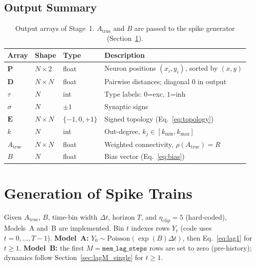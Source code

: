 \documentclass[11pt]{article}
\begin{document}
\subsection{Output Summary}

\begin{table}[h]
\centering
\begin{tabular}{llll}
\toprule
Array & Shape & Type & Description \\
\midrule
$\mathbf{P}$          & $N\times 2$ & float
  & Neuron positions $(x_i,y_i)$, sorted by $(x,y)$ \\
$\mathbf{D}$          & $N\times N$ & float
  & Pairwise distances; diagonal $0$ in output \\
$\tau$                & $N$         & int
  & Type labels: $0$=exc, $1$=inh \\
$\sigma$              & $N$         & $\pm1$
  & Synaptic signs \\
$\mathbf{E}$          & $N\times N$ & $\{-1,0,+1\}$
  & Signed topology (Eq.~\ref{eq:topology}) \\
$k$                   & $N$         & int
  & Out-degree, $k_j\in[k_{\text{min}},k_{\text{max}}]$ \\
$A_{\text{true}}$     & $N\times N$ & float
  & Weighted connectivity, $\rho(A_{\text{true}})=R$ \\
$B$                   & $N$         & float
  & Bias vector (Eq.~\ref{eq:bias}) \\
\bottomrule
\end{tabular}
\caption{Output arrays of Stage~1.
$A_{\text{true}}$ and $B$ are passed to the spike generator
(Section~\ref{sec:spike_gen}).}
\label{tab:output}
\end{table}

\section{Generation of Spike Trains}
\label{sec:spike_gen}

Given $A_{\text{true}}$, $B$, time-bin width $\Delta t$, horizon
$T$, and $\eta_{\mathrm{clip}}=5$ (hard-coded), Models~A and~B are
implemented.  Bin $t$ indexes rows $Y_t$ (code uses $t=0,\dots,T-1$).
\textbf{Model~A:} $Y_0\sim\mathrm{Poisson}(\exp(B)\Delta t)$, then
Eq.~\eqref{eq:lag1} for $t\ge 1$.
\textbf{Model~B:} the first $M=\texttt{mem\_lag\_steps}$ rows are set
to zero (pre-history); dynamics follow Section~\ref{sec:lagM_single}
for $t\ge 1$.
\end{document}
